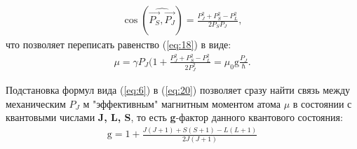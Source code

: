 \begin{gather*} 
\label{eq:19b} 
\cos(\widehat{\vec{P_S},\vec{P_J}})=\frac{P_J^2+P_S^2-P_L^2}{2P_S P_J},
\end{gather*}
что позволяет переписать равенство (\ref{eq:18}) в виде:
\begin{gather} 
\label{eq:20} 
\mu=\gamma P_J(1+\frac{P_J^2+P_S^2-P_L^2}{2P_J^2}=\mu_0 \text{g} \frac{P_J}{\hbar}.
\end{gather}
 
 Подстановка формул вида (\ref{eq:6}) в (\ref{eq:20}) позволяет сразу найти связь между механическим $P_J$ м "эффективным" магнитным моментом атома $\mu$ в состоянии с квантовыми числами \textbf{J, L, S}, то есть \textbf{g}-фактор данного квантового состояния:
\begin{gather} 
\label{eq:21} 
\text{g}=1+\frac{J(J+1)+S(S+1)-L(L+1)}{2J(J+1)}
\end{gather}